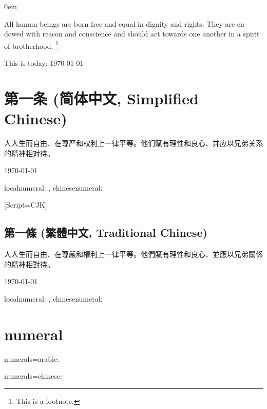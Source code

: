 \documentclass{article}
\begin{document}
\parindent0em

\begin{center}
	\abstractname
\end{center}
\begin{english}
All human beings are born free and equal in dignity and rights.
They are endowed with reason and conscience and should act towards one another in a spirit of brotherhood.
\footnote{%
	This is a footnote.}

This is today: \today
\end{english}

\section{第一条 (简体中文, Simplified Chinese)}

人人生而自由、在尊严和权利上一律平等。他们赋有理性和良心、并应以兄弟关系的精神相对待。

\today

localnumeral: , chinesenumeral: 

\renewfontfamily{}[Script=CJK]
\begin{chinese}[variant=traditional,numerals=chinese]

\section{第一條 (繁體中文, Traditional Chinese)}

人人生而自由、在尊嚴和權利上一律平等。他們賦有理性和良心、並應以兄弟關係的精神相對待。

\today

localnumeral: , chinesenumeral: 

\end{chinese}

\section{numeral}
\begin{english}

numerals=arabic: 

numerals=chinese: 

\end{english}
\end{document}
